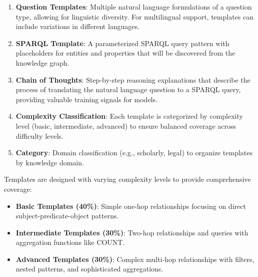 \begin{enumerate}
    \item \textbf{Question Templates}: Multiple natural language formulations of a question type, allowing for linguistic diversity. For multilingual support, templates can include variations in different languages.
    
    \item \textbf{SPARQL Template}: A parameterized SPARQL query pattern with placeholders for entities and properties that will be discovered from the knowledge graph.
    
    \item \textbf{Chain of Thoughts}: Step-by-step reasoning explanations that describe the process of translating the natural language question to a SPARQL query, providing valuable training signals for models.
    
    \item \textbf{Complexity Classification}: Each template is categorized by complexity level (basic, intermediate, advanced) to ensure balanced coverage across difficulty levels.
    
    \item \textbf{Category}: Domain classification (e.g., scholarly, legal) to organize templates by knowledge domain.
\end{enumerate}

Templates are designed with varying complexity levels to provide comprehensive coverage:

\begin{itemize}
    \item \textbf{Basic Templates (40\%)}: Simple one-hop relationships focusing on direct subject-predicate-object patterns.
    \item \textbf{Intermediate Templates (30\%)}: Two-hop relationships and queries with aggregation functions like COUNT.
    \item \textbf{Advanced Templates (30\%)}: Complex multi-hop relationships with filters, nested patterns, and sophisticated aggregations.
\end{itemize}


